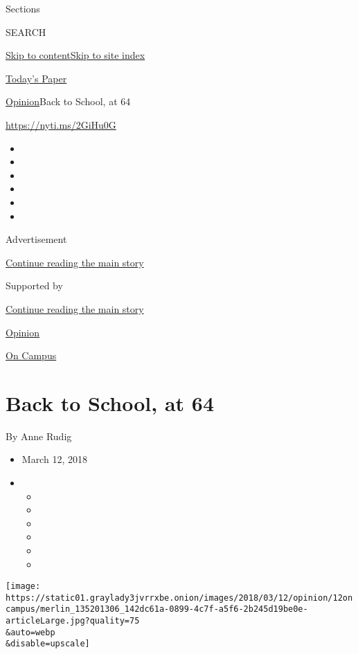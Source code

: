 Sections

SEARCH

\protect\hyperlink{site-content}{Skip to
content}\protect\hyperlink{site-index}{Skip to site index}

\href{https://myaccount.nytimes3xbfgragh.onion/auth/login?response_type=cookie\&client_id=vi}{}

\href{https://www.nytimes3xbfgragh.onion/section/todayspaper}{Today's
Paper}

\href{/section/opinion}{Opinion}\textbar{}Back to School, at 64

\url{https://nyti.ms/2GiHu0G}

\begin{itemize}
\item
\item
\item
\item
\item
\item
\end{itemize}

Advertisement

\protect\hyperlink{after-top}{Continue reading the main story}

Supported by

\protect\hyperlink{after-sponsor}{Continue reading the main story}

\href{/section/opinion}{Opinion}

\href{/column/on-campus}{On Campus}

\hypertarget{back-to-school-at-64}{%
\section{Back to School, at 64}\label{back-to-school-at-64}}

By Anne Rudig

\begin{itemize}
\item
  March 12, 2018
\item
  \begin{itemize}
  \item
  \item
  \item
  \item
  \item
  \item
  \end{itemize}
\end{itemize}

\texttt{[image: https://static01.graylady3jvrrxbe.onion/images/2018/03/12/opinion/12oncampus/merlin\_135201306\_142dc61a-0899-4c7f-a5f6-2b245d19be0e-articleLarge.jpg?quality=75\\\&auto=webp\\\&disable=upscale]}

